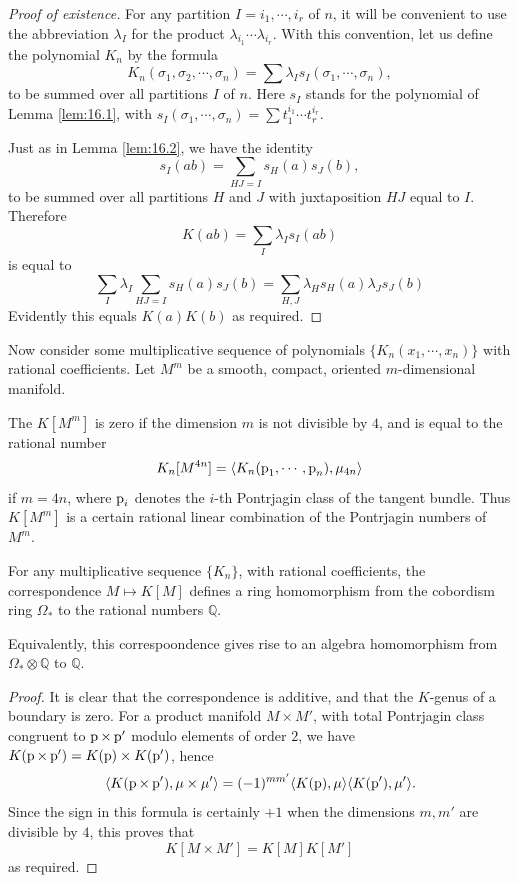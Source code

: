 \documentclass[../main]{subfiles}
\begin{document}
\begin{proof}[Proof of existence]
For any partition $I = i_1,\cdots,i_r$ of $n$, it will be convenient to use the abbreviation $\lambda_I$ for the product $\lambda_{i_1} \cdots \lambda_{i_r}$. With this convention, let us define the polynomial $K_n$ by the formula \[K_n(\sigma_1,\sigma_2,\cdots,\sigma_n) = \sum \lambda_I s_I(\sigma_1,\cdots,\sigma_n),\] to be summed over all partitions $I$ of $n$. Here $s_I$ stands for the polynomial of Lemma \ref{lem:16.1}, with $s_I(\sigma_1,\cdots,\sigma_n) = \sum t_1^{i_1}\cdots t_r^{i_r}$.

Just as in Lemma \ref{lem:16.2}, we have the identity \[s_I(ab) = \sum_{HJ = I} s_H(a) s_J(b),\] to be summed over all partitions $H$ and $J$ with juxtaposition $HJ$ equal to $I$. Therefore \[K(ab) = \sum_I \lambda_I s_I(ab)\] is equal to \[\sum_I \lambda_I \sum_{HJ = I} s_H(a)s_J(b) = \sum_{H,J} \lambda_H s_H(a)\lambda_J s_J(b)\] Evidently this equals $K(a)K(b)$ as required.
\end{proof}
Now consider some multiplicative sequence of polynomials $\{K_n(x_1,\cdots,x_n)\}$ with rational coefficients. Let $M^m$ be a smooth, compact, oriented $m$-dimensional manifold.

\begin{definition}
The  $K[M^m]$ is zero if the dimension $m$ is not divisible by $4$, and is equal to the rational number \[K_n[M^{4n}] = \langle K_n(\operatorname{p}_1,\cdots,\operatorname{p}_n),\mu_{4n} \rangle \] if $m=4n$, where $\operatorname{p}_i$ denotes the $i$-th Pontrjagin class of the tangent bundle. Thus $K[M^m]$ is a certain rational linear combination of the Pontrjagin numbers of $M^m$.
\end{definition}
\begin{lemma}
\label{lem:19.02}
For any multiplicative sequence $\{K_n\}$, with rational coefficients, the correspondence $M \mapsto K[M]$ defines a ring homomorphism from the cobordism ring $\Omega_\ast$ to the rational numbers $\mathbb{Q}$.
\end{lemma}
Equivalently, this correspoondence gives rise to an algebra homomorphism from $\Omega_\ast \otimes \mathbb{Q}$ to $\mathbb{Q}$.
\begin{proof}
It is clear that the correspondence is additive, and that the $K$-genus of a boundary is zero. For a product manifold $M \times M'$, with total Pontrjagin class congruent to $\operatorname{p} \times \operatorname{p}'$ modulo elements of order $2$, we have \newline $K(\operatorname{p} \times \operatorname{p}') = K(\operatorname{p}) \times K(\operatorname{p}')$, hence 
\[\langle K(\operatorname{p} \times \operatorname{p}'), \mu \times \mu' \rangle = (-1)^{mm'} \langle K(\operatorname{p}),\mu \rangle \langle K(\operatorname{p}'),\mu' \rangle .\] Since the sign in this formula is certainly $+1$ when the dimensions $m,m'$ are divisible by $4$, this proves that \[K[M \times M'] = K[M]K[M']\] as required.
\end{proof}
\end{document}
